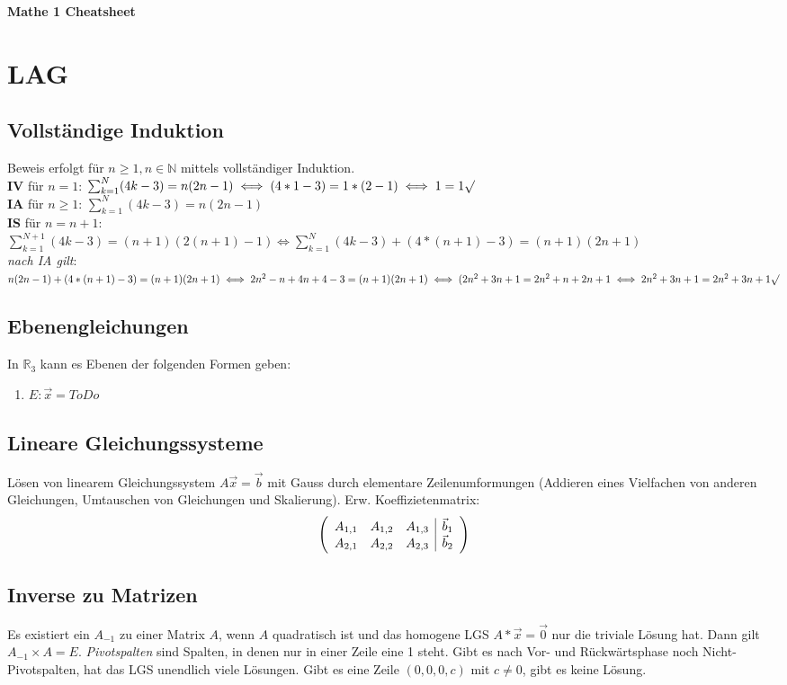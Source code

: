 \documentclass[12pt,landscape]{article}
\begin{document}
\footnotesize
\begin{multicols}{3}

\begin{center}
     \Large{\textbf{Mathe 1 Cheatsheet}}
\end{center}

\section{LAG}
\subsection{Vollständige Induktion}
Beweis erfolgt für $n \geq 1, n \in{\mathbb{N}}$ mittels vollständiger Induktion.\\
\textbf{IV} für $n = 1$: $\sum_{k=1}^N(4k-3) = n(2n - 1) \iff (4*1-3) = 1*(2-1) \iff 1 = 1 \surd$ \\
\textbf{IA} für $n \geq 1$: $\sum_{k=1}^N(4k-3) = n(2n-1)$\\
\textbf{IS} für $n = n + 1:$\\
$\sum_{k=1}^{N+1}(4k-3) = (n+1)(2(n+1)-1) \iff \sum_{k=1}^{N}(4k-3) + (4*(n+1)-3) = (n+1)(2n+1)$\\
\textit{nach IA gilt}:\\
$n(2n-1)+(4*(n+1)-3)=(n+1)(2n+1)\iff
2n^2-n+4n+4-3=(n+1)(2n+1) \iff
(2n^2+3n+1 = 2n^2 + n + 2n + 1 \iff 2n^2 + 3n + 1 = 2n^2 + 3n + 1 \surd$
\subsection{Ebenengleichungen}
In $\mathbb{R}_3$ kann es Ebenen der folgenden Formen geben:
\begin{enumerate}
\item $E: \vec{x} = ToDo$
\end{enumerate}
\subsection{Lineare Gleichungssysteme}
Lösen von linearem Gleichungssystem $A\vec{x}=\vec{b}$ mit Gauss durch elementare Zeilenumformungen (Addieren eines Vielfachen von anderen Gleichungen, Umtauschen von Gleichungen und Skalierung). Erw. Koeffizietenmatrix:
\[\begin{array}({ccc|c})
  A_{1,1} & A_{1,2} & A_{1,3} & \vec{b}_1\\
  A_{2,1} & A_{2,2} & A_{2,3} & \vec{b}_2
\end{array}\]
\subsection{Inverse zu Matrizen}
Es existiert ein $A_{-1}$ zu einer Matrix $A$, wenn $A$ quadratisch ist und das homogene LGS $A * \vec{x} = \vec{0}$ nur die triviale Lösung hat. Dann gilt $A_{-1} \times A = E$.
\textit{Pivotspalten} sind Spalten, in denen nur in einer Zeile eine 1 steht. Gibt es nach Vor- und Rückwärtsphase noch Nicht-Pivotspalten, hat das LGS unendlich viele Lösungen. Gibt es eine Zeile $(0,0,0,c)$ mit $c \neq 0$, gibt es keine Lösung.

\end{multicols}
\end{document}
